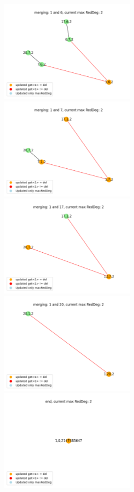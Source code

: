 \documentclass[10pt]{article}
\begin{document}
\includegraphics[width=0.5\textwidth]{images/merge20.png}
\includegraphics[width=0.5\textwidth]{images/merge21.png}
\includegraphics[width=0.5\textwidth]{images/merge22.png}
\includegraphics[width=0.5\textwidth]{images/merge23.png}
\includegraphics[width=0.5\textwidth]{images/merge24.png}
\end{document}
